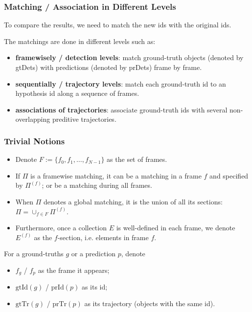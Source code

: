 \documentclass[slidetop, mathserif]{beamer}
\begin{document}
\begin{frame}
	\frametitle{Matching / Association in Different Levels}
	
	To compare the results, we need to match the new ids
	with the original ids.

	\vspace{4pt}
	
	The matchings are done in different levels such as:
	\begin{itemize}
		\item {\bf framewisely / detection levels}:
		      match ground-truth objects (denoted by gtDets)
		      with predictions (denoted by prDets) frame by frame.
		\item {\bf sequentially / trajectory levels}:
		      match each ground-truth id to an hypothesis id along a sequence of frames.
		\item {\bf associations of trajectories}:
			associate ground-truth ids with several non-overlapping preditive trajectories.
	\end{itemize}

	
\end{frame}

\begin{frame}
	\frametitle{Trivial Notions}
	
	\begin{itemize}
		\item Denote $F:=\{f_0, f_1, \ldots, f_{N-1}\}$ as the set of frames.
		\item If $\Pi$ is a framewise matching, it can be a matching in a frame $f$ and specified by $\Pi^{(f)}$;
		      or be a matching during all frames.
		\item When $\Pi$ denotes a global matching, it is the union of all its sections:
		      $\Pi = \cup_{f\in F}\Pi^{(f)}$.
		\item Furthermore, once a collection $E$ is well-defined in each frame,
		      we denote $E^{(f)}$ as the $f$-section, i.e. elements in frame $f$.
		      
	\end{itemize}
	
	For a ground-truths $g$ or a prediction $p$, denote
	\begin{itemize}
		\item $f_g$ / $f_p$ as the frame it appears;
		\item $\text{gtId}(g)$ / $\text{prId}(p)$ as its id;
		\item $\text{gtTr}(g)$ / $\text{prTr}(p)$ as its trajectory (objects with the same id).
	\end{itemize}
\end{frame}
\end{document}
